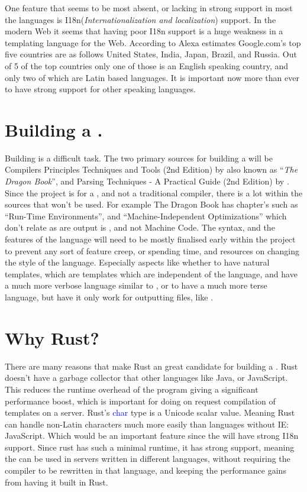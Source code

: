 One feature that seems to be most absent, or lacking in strong support in most the languages is I18n(\textit{Internationalization and localization}) support. In the modern Web it seems that having poor I18n support is a huge weakness in a templating language for the Web. According to Alexa estimates Google.com's top five countries are as follows United States, India, Japan, Brazil, and Russia. Out of 5 of the top countries only one of those is an English speaking country, and only two of which are Latin based languages. It is important now more than ever to have strong support for other speaking languages.
\newpage
\section{Building a \compiler{}.}
Building \compiler{} is a difficult task. The two primary sources for building a \compiler{} will be Compilers Principles Techniques and Tools (2nd Edition) by \parencite{DragonBook} also known as ``\textit{The Dragon Book}'', and Parsing Techniques - A Practical Guide (2nd Edition) by \parencite{ParseTech}. Since the project is for a \compiler{}, and not a traditional compiler, there is a lot within the sources that won't be used. For example The Dragon Book has chapter's such as ``Run-Time Environments'', and ``Machine-Independent Optimizations'' which don't relate as are output is , and not Machine Code. The syntax, and the features of the language will need to be mostly finalised early within the project to prevent any sort of feature creep, or spending time, and resources on changing the style of the language. Especially aspects like whether to have natural templates, which are templates which are independent of the language, and have a much more verbose language similar to \parencite{Mustache}, or to have a much more terse language, but have it only work for outputting  files, like \parencite{Jade}. 

\section{Why Rust?}
There are many reasons that make Rust an great candidate for building a \compiler{}. Rust doesn't have a garbage collector that other languages like Java, or JavaScript. This reduces the runtime overhead of the program giving a significant performance boost, which is important for doing on request compilation of templates on a server. Rust's \textcolor{blue}{char} type is a Unicode scalar value. Meaning Rust can handle non-Latin characters much more easily than languages without IE: JavaScript. Which would be an important feature since the \languageName{} will have strong I18n support. Since rust has such a minimal runtime, it has strong  support, meaning the \compiler{} can be used in servers written in different languages, without requiring the compiler to be rewritten in that language, and keeping the performance gains from having it built in Rust.